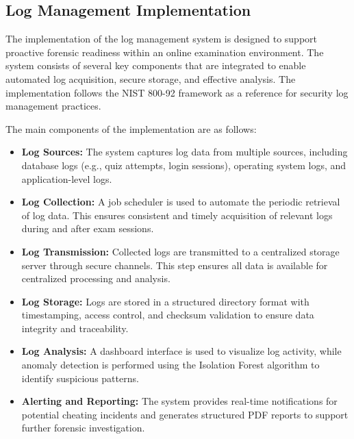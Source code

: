 \subsection{Log Management Implementation}

The implementation of the log management system is designed to support proactive forensic readiness within an online examination environment. The system consists of several key components that are integrated to enable automated log acquisition, secure storage, and effective analysis. The implementation follows the NIST 800-92 framework as a reference for security log management practices.

The main components of the implementation are as follows:

\begin{itemize}
    \item \textbf{Log Sources:} The system captures log data from multiple sources, including database logs (e.g., quiz attempts, login sessions), operating system logs, and application-level logs.

    \item \textbf{Log Collection:} A job scheduler is used to automate the periodic retrieval of log data. This ensures consistent and timely acquisition of relevant logs during and after exam sessions.

    \item \textbf{Log Transmission:} Collected logs are transmitted to a centralized storage server through secure channels. This step ensures all data is available for centralized processing and analysis.

    \item \textbf{Log Storage:} Logs are stored in a structured directory format with timestamping, access control, and checksum validation to ensure data integrity and traceability.

    \item \textbf{Log Analysis:} A dashboard interface is used to visualize log activity, while anomaly detection is performed using the Isolation Forest algorithm to identify suspicious patterns.

    \item \textbf{Alerting and Reporting:} The system provides real-time notifications for potential cheating incidents and generates structured PDF reports to support further forensic investigation.
\end{itemize}

